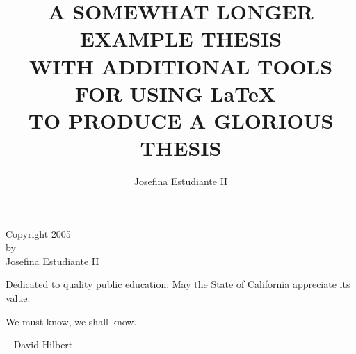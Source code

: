 \documentclass{sdsu-thesis}
\author{Josefina Estudiante II}
\title{A SOMEWHAT LONGER EXAMPLE THESIS \\
     WITH ADDITIONAL TOOLS  \\
FOR USING  \LaTeX\   \\
TO PRODUCE A GLORIOUS THESIS}
\begin{document}
\maketitle

\makesignature

\begin{copyrightpage}
Copyright 2005 \\
by \\
Josefina Estudiante II
\end{copyrightpage}

\begin{dedication}
\vspace{3in}
\centering
Dedicated to quality public education:  May the State of California
appreciate its value.
\end{dedication}

\begin{epigraph}
We must know, we shall know.\\
\begin{flushright}
-- David Hilbert
\end{flushright}
\end{epigraph}

\begin{abstract}

\end{abstract}

\tableofcontents

\listoftables

\listoffigures
\end{document}
